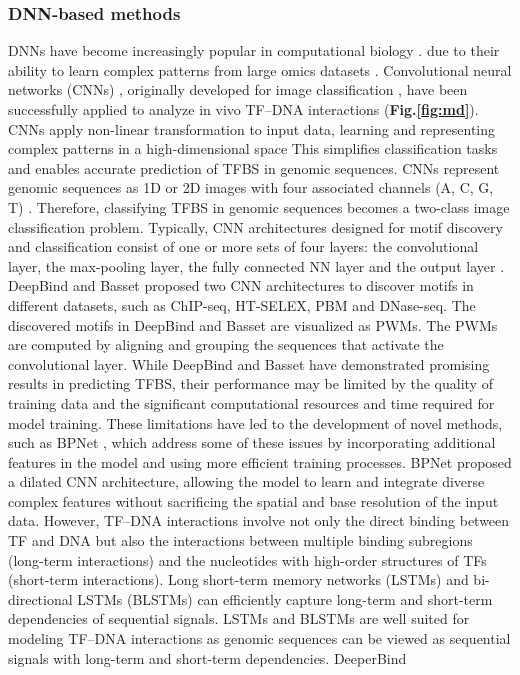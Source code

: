 \documentclass[a4paper, titlepage, openright]{book}
\begin{document}
\subsubsection{DNN-based methods}
DNNs have become increasingly popular in computational biology \citep{talukder2021interpretation, zeng2020integrating, singh2016deepchrome, singh2019predicting, zeng2018prediction, kelley2018sequential, li2019deeptact, yin2019deephistone, manzanarez2018model}. due to their ability to learn complex patterns \citep{park2015deep} from large omics datasets \citep{zhang2019deep}. Convolutional neural networks (CNNs)  \citep{lecun2015deep} , originally developed for image classification \citep{lecun2015deep, sainath2013improvements, vu2017use},  have been successfully applied to analyze in vivo TF–DNA interactions \citep{alipanahi2015predicting, zhou2015predicting, kelley2016basset, zeng2016convolutional} (\textbf{Fig.\ref{fig:md}}). CNNs apply non-linear transformation to input data, learning and representing complex patterns in a high-dimensional space \citep{bengio2013representation} This simplifies classification tasks and enables accurate prediction of TFBS in genomic sequences. CNNs represent genomic sequences as 1D or 2D images with four associated channels (A, C, G, T) \citep{zeng2016convolutional}. Therefore, classifying TFBS in genomic sequences becomes a two-class image classification problem. Typically, CNN architectures designed for motif discovery and classification consist of one or more sets of four layers: the convolutional layer, the max-pooling layer, the fully connected NN layer and the output layer \citep{zeng2016convolutional}. DeepBind \citep{alipanahi2015predicting} and Basset \citep{kelley2016basset} proposed two CNN architectures to discover motifs in different datasets, such as ChIP-seq, HT-SELEX, PBM and DNase-seq. The discovered motifs in DeepBind and Basset are visualized as PWMs. The PWMs are computed by aligning and grouping the sequences that activate the convolutional layer. While DeepBind and Basset have demonstrated promising results in predicting TFBS, their performance may be limited by the quality of training data and the significant computational resources and time required for model training. These limitations have led to the development of novel methods, such as BPNet \citep{avsec2021base},  which address some of these issues by incorporating additional features in the model and using more efficient training processes. BPNet proposed a dilated CNN architecture, allowing the model to learn and integrate diverse complex features without sacrificing the spatial and base resolution of the input data.  However, TF–DNA interactions involve not only the direct binding between TF and DNA but also the interactions between multiple binding subregions (long-term interactions) and the nucleotides with high-order structures of TFs (short-term interactions). Long short-term memory networks (LSTMs) \citep{hochreiter1997long} and bi-directional LSTMs (BLSTMs) can efficiently capture long-term and short-term dependencies of sequential signals. LSTMs and BLSTMs are well suited for modeling TF–DNA interactions as genomic sequences can be viewed as sequential signals with long-term and short-term dependencies. DeeperBind 
\end{document}
